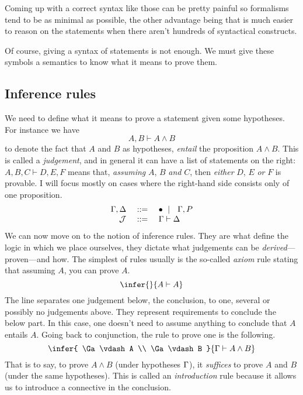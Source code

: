 Coming up with a correct syntax like those can be pretty painful so formalisms
tend to be as minimal as possible, the other advantage being that is much easier
to reason on the statements when there aren't hundreds of syntactical
constructs.

Of course, giving a syntax of statements is not enough. We must give these
symbols a semantics to know what it means to prove them.

\subsection{Inference rules}

We need to define what it means to prove a statement given some hypotheses.
For instance we have
\[
  A, B \vdash A \wedge B
\]
to denote the fact that \(A\) and \(B\) as hypotheses, \emph{entail} the
proposition \(A \wedge B\).
This is called a \emph{judgement}, and in general it can have a list of
statements on the right: \(A, B, C \vdash D, E, F\) means that, \emph{assuming}
\(A\), \(B\) \emph{and} \(C\), then \emph{either} \(D\), \(E\) \emph{or} \(F\)
is provable.
I will focus mostly on cases where the right-hand side consists only
of one proposition.
\[
  \begin{array}{rcl}
    \Gamma, \Delta &\ \mathrel{{:}{:}{=}}\ & \bullet \ \mid\ \  \Gamma, P \\
    \mathcal{J} &\ \mathrel{{:}{:}{=}}\ & \Gamma \vdash \Delta
  \end{array}
\]
We can now move on to the notion of inference rules. They are what define the
logic in which we place ourselves, they dictate what judgements can be
\emph{derived}---\ie proven---and how.
The simplest of rules usually is the so-called \emph{axiom} rule stating that
assuming \(A\), you can prove \(A\).
\[
  \infer
    { }
    {A \vdash A}
\]
The line separates one judgement below, the conclusion, to one, several or
possibly no judgements above. They represent requirements to conclude the below
part. In this case, one doesn't need to assume anything to conclude that \(A\)
entails \(A\).
Going back to conjunction, the rule to prove one is the following.
\[
  \infer
    {
      \Ga \vdash A \\
      \Ga \vdash B
    }
    {\Ga \vdash A \wedge B}
\]
That is to say, to prove \(A \wedge B\) (under hypotheses \(\Gamma\)), it
\emph{suffices} to prove \(A\) and \(B\) (under the same hypotheses).
This is called an \emph{introduction} rule because it allows us to introduce a
connective in the conclusion.
